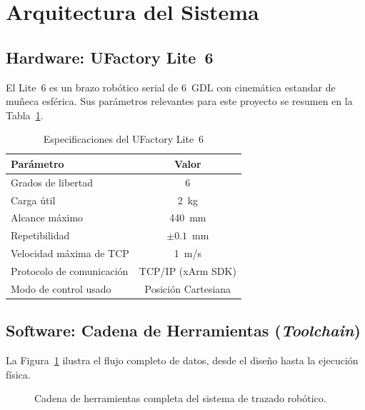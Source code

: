 \documentclass[journal,compsoc]{IEEEtran}
\begin{document}
\section{Arquitectura del Sistema}

\subsection{Hardware: UFactory Lite~6}

El Lite~6 es un brazo robótico serial de 6~GDL con cinemática estandar de muñeca esférica. Sus parámetros relevantes para este proyecto se resumen en la Tabla~\ref{tab:specs}.

\begin{table}[h]
\renewcommand{\arraystretch}{1.3}
\caption{Especificaciones del UFactory Lite~6}
\label{tab:specs}
\centering
\begin{tabular}{lc}
\toprule
\textbf{Parámetro} & \textbf{Valor} \\
\midrule
Grados de libertad       & 6 \\
Carga útil               & 2~kg \\
Alcance máximo           & 440~mm \\
Repetibilidad            & $\pm 0.1$~mm \\
Velocidad máxima de TCP  & 1~m/s \\
Protocolo de comunicación& TCP/IP (xArm SDK) \\
Modo de control usado    & Posición Cartesiana \\
\bottomrule
\end{tabular}
\end{table}

\subsection{Software: Cadena de Herramientas (\textit{Toolchain})}

La Figura~\ref{fig:toolchain} ilustra el flujo completo de datos, desde el diseño hasta la ejecución física.

\begin{figure}[h]
    \centering
    \caption{Cadena de herramientas completa del sistema de trazado robótico.}
    \label{fig:toolchain}
\end{figure}
\end{document}
